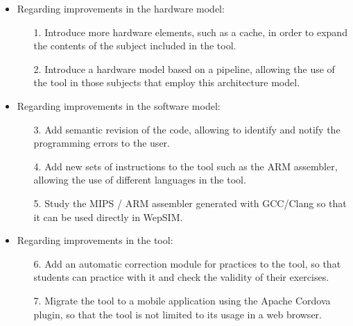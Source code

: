 \begin{itemize}

\item Regarding improvements in the hardware model:

\begin{itemize}

\item[1.] Introduce more hardware elements, such as a cache, in order to expand the contents of the subject included in the tool.

\item[2.] Introduce a hardware model based on a pipeline, allowing the use of the tool in those subjects that employ this architecture model.

\end{itemize}

\item Regarding improvements in the software model:

\begin{itemize}

\item[3.] Add semantic revision of the code, allowing to identify and notify the programming errors to the user.

\item[4.] Add new sets of instructions to the tool such as the ARM assembler, allowing the use of different languages in the tool.

\item[5.] Study the MIPS / ARM assembler generated with GCC/Clang so that it can be used directly in WepSIM.

\end{itemize}

\item Regarding improvements in the tool:

\begin{itemize}

\item[6.] Add an automatic correction module for practices to the tool, so that students can practice with it and check the validity of their exercises.

\item[7.] Migrate the tool to a mobile application using the Apache Cordova plugin, so that the tool is not limited to its usage in a web browser.

\end{itemize}

\end{itemize}

